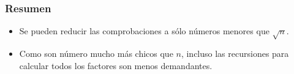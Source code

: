 \documentclass{beamer}
\begin{document}
\begin{frame}
  \frametitle{Resumen}

  \begin{itemize}
  \item Se pueden reducir las comprobaciones a s\'olo n\'umeros menores que $\sqrt{n}$.
  \item Como son n\'umero mucho m\'as chicos que $n$, incluso las recursiones para calcular todos los factores son menos demandantes.
  \end{itemize}
  
\end{frame}
\end{document}
